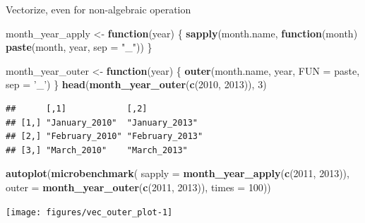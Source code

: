 \documentclass[10pt,ignorenonframetext,]{beamer}
\newenvironment{Shaded}{\begin{snugshade}}{\end{snugshade}}
\newcommand{\KeywordTok}[1]{\textcolor[rgb]{0.13,0.29,0.53}{\textbf{#1}}}
\newcommand{\DataTypeTok}[1]{\textcolor[rgb]{0.13,0.29,0.53}{#1}}
\newcommand{\DecValTok}[1]{\textcolor[rgb]{0.00,0.00,0.81}{#1}}
\newcommand{\StringTok}[1]{\textcolor[rgb]{0.31,0.60,0.02}{#1}}
\newcommand{\ControlFlowTok}[1]{\textcolor[rgb]{0.13,0.29,0.53}{\textbf{#1}}}
\newcommand{\NormalTok}[1]{#1}
\begin{document}
\begin{frame}{Vectorize, even for
non-algebraic operation}

\scriptsize

\begin{Shaded}
\begin{Highlighting}[]
\NormalTok{month_year_apply <-}\StringTok{ }\ControlFlowTok{function}\NormalTok{(year) \{}
  \KeywordTok{sapply}\NormalTok{(month.name, }\ControlFlowTok{function}\NormalTok{(month) }\KeywordTok{paste}\NormalTok{(month, year, }\DataTypeTok{sep =} \StringTok{"_"}\NormalTok{))  }
\NormalTok{\}}

\NormalTok{month_year_outer <-}\StringTok{ }\ControlFlowTok{function}\NormalTok{(year) \{}
  \KeywordTok{outer}\NormalTok{(month.name, year, }\DataTypeTok{FUN =}\NormalTok{ paste, }\DataTypeTok{sep =} \StringTok{'_'}\NormalTok{)}
\NormalTok{\}}
\KeywordTok{head}\NormalTok{(}\KeywordTok{month_year_outer}\NormalTok{(}\KeywordTok{c}\NormalTok{(}\DecValTok{2010}\NormalTok{, }\DecValTok{2013}\NormalTok{)), }\DecValTok{3}\NormalTok{)}
\end{Highlighting}
\end{Shaded}

\color{gray}

\begin{verbatim}##      [,1]            [,2]           
## [1,] "January_2010"  "January_2013" 
## [2,] "February_2010" "February_2013"
## [3,] "March_2010"    "March_2013"
\end{verbatim}

\normalsize

\scriptsize

\begin{Shaded}
\begin{Highlighting}[]
\KeywordTok{autoplot}\NormalTok{(}\KeywordTok{microbenchmark}\NormalTok{(}
  \DataTypeTok{sapply =} \KeywordTok{month_year_apply}\NormalTok{(}\KeywordTok{c}\NormalTok{(}\DecValTok{2011}\NormalTok{, }\DecValTok{2013}\NormalTok{)),}
  \DataTypeTok{outer  =} \KeywordTok{month_year_outer}\NormalTok{(}\KeywordTok{c}\NormalTok{(}\DecValTok{2011}\NormalTok{, }\DecValTok{2013}\NormalTok{)), }
  \DataTypeTok{times =} \DecValTok{100}\NormalTok{))}
\end{Highlighting}
\end{Shaded}

\begin{center}\texttt{[image: figures/vec\_outer\_plot-1]} \end{center}

\normalsize

\end{frame}
\end{document}
